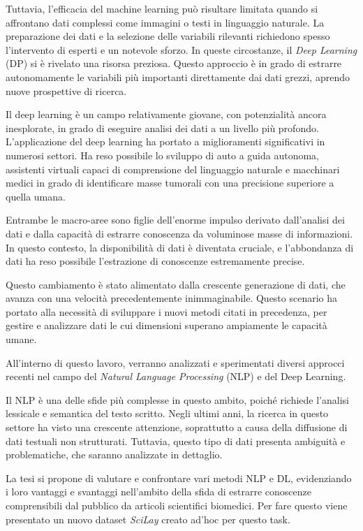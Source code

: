 \documentclass[12pt,a4paper,twoside,openright]{book}
\begin{document}
Tuttavia, l'efficacia del machine learning può risultare limitata quando si affrontano dati complessi come immagini o testi in linguaggio naturale. La preparazione dei dati e la selezione delle variabili rilevanti richiedono spesso l'intervento di esperti e un notevole sforzo. In queste circostanze, il \emph{Deep Learning} (DP) si è rivelato una risorsa preziosa. Questo approccio è in grado di estrarre autonomamente le variabili più importanti direttamente dai dati grezzi, aprendo nuove prospettive di ricerca.

Il deep learning è un campo relativamente giovane, con potenzialità ancora inesplorate, in grado di eseguire analisi dei dati a un livello più profondo.
L'applicazione del deep learning ha portato a miglioramenti significativi in numerosi settori. Ha reso possibile lo sviluppo di auto a guida autonoma, assistenti virtuali capaci di comprensione del linguaggio naturale e macchinari medici in grado di identificare masse tumorali con una precisione superiore a quella umana.


Entrambe le macro-aree sono figlie dell'enorme impulso derivato dall'analisi dei dati e dalla capacità di estrarre conoscenza da voluminose masse di informazioni. In questo contesto, la disponibilità di dati è diventata cruciale, e l'abbondanza di dati ha reso possibile l'estrazione di conoscenze estremamente precise.

Questo cambiamento è stato alimentato dalla crescente generazione di dati, che avanza con una velocità precedentemente inimmaginabile. Questo scenario ha portato alla necessità di sviluppare i nuovi metodi citati in precedenza, per gestire e analizzare dati le cui dimensioni superano ampiamente le capacità umane.

All'interno di questo lavoro, verranno analizzati e sperimentati diversi approcci recenti nel campo del \emph{Natural Language Processing} (NLP) e del Deep Learning.

Il NLP è una delle sfide più complesse in questo ambito, poiché richiede l'analisi lessicale e semantica del testo scritto. Negli ultimi anni, la ricerca in questo settore ha visto una crescente attenzione, soprattutto a causa della diffusione di dati testuali non strutturati. Tuttavia, questo tipo di dati presenta ambiguità e problematiche, che saranno analizzate in dettaglio.

La tesi si propone di valutare e confrontare vari metodi NLP e DL, evidenziando i loro vantaggi e svantaggi nell'ambito della sfida di estrarre conoscenze comprensibili dal pubblico da articoli scientifici biomedici.
Per fare questo viene presentato un nuovo dataset \emph{SciLay} creato ad'hoc per questo task.
\end{document}
